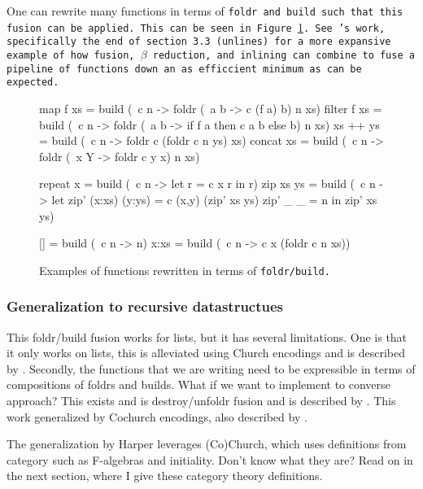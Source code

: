 One can rewrite many functions in terms of \tt{foldr} and \tt{build} such that this fusion can be applied. This can be seen in Figure \ref{fig:foldr/build_ex}.
See \cite{Gill1993}'s work, specifically the end of section 3.3 (\tt{unlines}) for a more expansive example of how fusion, $\beta$ reduction, and inlining can combine to fuse a pipeline of functions down an as efficcient minimum as can be expected.
\begin{figure}[h]
    \centering
    \begin{code}
    map f xs    = build (\ c n -> foldr (\ a b -> c (f a) b) n xs)
    filter f xs = build (\ c n -> foldr (\ a b -> if f a then c a b else b) n xs)
    xs ++ ys    = build (\ c n -> foldr c (foldr c n ys) xs)
    concat xs   = build (\ c n -> foldr (\ x Y -> foldr c y x) n xs)
    
    repeat x    = build (\ c n -> let r = c x r in r)
    zip xs ys   = build (\ c n -> let zip' (x:xs) (y:ys) = c (x,y) (zip' xs ys)
                                      zip' _      _      = n
                                      in zip' xs ys)

    []         = build (\ c n -> n)
    x:xs       = build (\ c n -> c x (foldr c n xs))
    \end{code}
    \caption{Examples of functions rewritten in terms of \tt{foldr/build}. \citep{Gill1993}}
    \label{fig:foldr/build_ex}
\end{figure}



\subsubsection{Generalization to recursive datastructues}
This foldr/build fusion works for lists, but it has several limitations.
One is that it only works on lists, this is alleviated using Church encodings and is described by \cite{Harper2011}.
Secondly, the functions that we are writing need to be expressible in terms of compositions of foldrs and builds. What if we want to implement to converse approach?
This exists and is destroy/unfoldr fusion and is described by \cite{Coutts2007}.
This work generalized by Cochurch encodings, also described by \cite{Harper2011}.

The generalization by Harper leverages (Co)Church, which uses definitions from category such as F-algebras and initiality.
Don't know what they are? Read on in the next section, where I give these category theory definitions.

